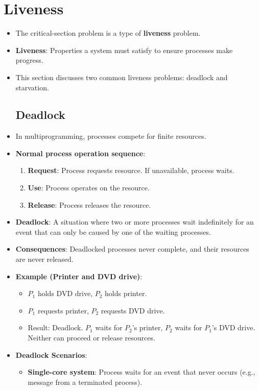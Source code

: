 \section{Liveness}
\begin{itemize}
    \item The critical-section problem is a type of \textbf{liveness} problem.
    \item \textbf{Liveness}: Properties a system must satisfy to ensure processes make progress.
    \item This section discusses two common liveness problems: deadlock and starvation.

    \subsection{Deadlock}
    \item In multiprogramming, processes compete for finite resources.
    \item \textbf{Normal process operation sequence}:
    \begin{enumerate}
        \item \textbf{Request}: Process requests resource. If unavailable, process waits.
        \item \textbf{Use}: Process operates on the resource.
        \item \textbf{Release}: Process releases the resource.
    \end{enumerate}
    \item \textbf{Deadlock}: A situation where two or more processes wait indefinitely for an event that can only be caused by one of the waiting processes.
    \item \textbf{Consequences}: Deadlocked processes never complete, and their resources are never released.
    \item \textbf{Example (Printer and DVD drive)}:
    \begin{itemize}
        \item $P_1$ holds DVD drive, $P_2$ holds printer.
        \item $P_1$ requests printer, $P_2$ requests DVD drive.
        \item Result: Deadlock. $P_1$ waits for $P_2$'s printer, $P_2$ waits for $P_1$'s DVD drive. Neither can proceed or release resources.
    \end{itemize}
    \item \textbf{Deadlock Scenarios}:
    \begin{itemize}
        \item \textbf{Single-core system}: Process waits for an event that never occurs (e.g., message from a terminated process).

\end{itemize}
\end{itemize}
